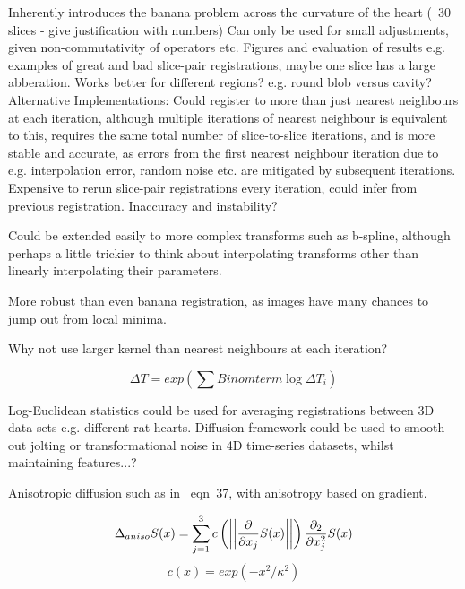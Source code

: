   Inherently introduces the banana problem across the curvature of the heart (~30 slices - give justification with numbers)
  Can only be used for small adjustments, given non-commutativity of operators etc.
  Figures and evaluation of results e.g. examples of great and bad slice-pair registrations, maybe one slice has a large abberation. Works better for different regions? e.g. round blob versus cavity?
  Alternative Implementations:
  Could register to more than just nearest neighbours at each iteration, although multiple iterations of nearest neighbour is equivalent to this, requires the same total number of slice-to-slice iterations, and is more stable and accurate, as errors from the first nearest neighbour iteration due to e.g. interpolation error, random noise etc. are mitigated by subsequent iterations.
  Expensive to rerun slice-pair registrations every iteration, could infer from previous registration. Inaccuracy and instability?
  
  Could be extended easily to more complex transforms such as b-spline, although perhaps a little trickier to think about interpolating transforms other than linearly interpolating their parameters.
  
  More robust than even banana registration, as images have many chances to jump out from local minima.
  
  Why not use larger kernel than nearest neighbours at each iteration?
  
  \begin{equation}
          \Delta T = exp \left( \sum Binom term \log \Delta T_i \right)
  \end{equation}
    
  Log-Euclidean statistics could be used for averaging registrations between 3D data sets e.g. different rat hearts. Diffusion framework could be used to smooth out jolting or transformational noise in 4D time-series datasets, whilst maintaining features...?
  
  Anisotropic diffusion such as in~\cite{Arsigny2005} eqn~37, with anisotropy based on gradient.
  
  \begin{equation}
    \Delta_{aniso}S(x)  = \sum_{j=1}^3 c\left(\left|\left| \frac{\partial}{\partial x_j}S(x)\right|\right|\right) \\
                            \frac{\partial_2}{\partial x_j^2}S(x)
  \end{equation}
  \begin{equation}
    c(x) = exp(-x^2/\kappa^2)
  \end{equation}

